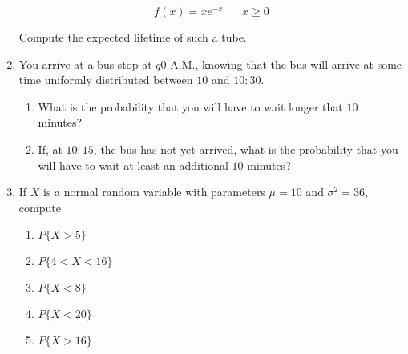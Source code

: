 \begin{enumerate}
$$f(x) = xe^{-x} \hspace{20pt} x \geq 0$$

Compute the expected lifetime of such a tube.

\item You arrive at a bus stop at $q0$ A.M., knowing that the bus will arrive at some time uniformly distributed between $10$ and $10:30$.

\begin{enumerate}
	\item What is the probability that you will have to wait longer that $10$ minutes?
	\item If, at $10:15$, the bus has not yet arrived, what is the probability that you will have to wait at least an additional $10$ minutes?
\end{enumerate}

\item If $X$ is a normal random variable with parameters $\mu = 10$ and $\sigma^2 = 36$, compute

	\begin{enumerate}
	\item $P\{X > 5\}$
	\item $P\{4 < X < 16\}$
	\item $P\{X < 8\}$
	\item $P\{X < 20\}$
	\item $P\{X > 16\}$
	\end{enumerate}
\end{enumerate}





